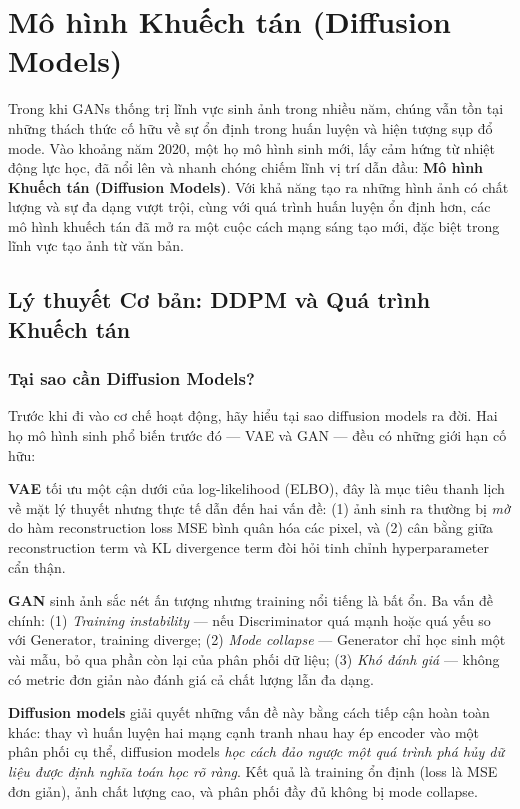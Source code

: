 \section{Mô hình Khuếch tán (Diffusion Models)}
\label{sec:diffusion_models}

Trong khi GANs thống trị lĩnh vực sinh ảnh trong nhiều năm, chúng vẫn tồn tại những thách thức cố hữu về sự ổn định trong huấn luyện và hiện tượng sụp đổ mode. Vào khoảng năm 2020, một họ mô hình sinh mới, lấy cảm hứng từ nhiệt động lực học, đã nổi lên và nhanh chóng chiếm lĩnh vị trí dẫn đầu: \textbf{Mô hình Khuếch tán (Diffusion Models)}. Với khả năng tạo ra những hình ảnh có chất lượng và sự đa dạng vượt trội, cùng với quá trình huấn luyện ổn định hơn, các mô hình khuếch tán đã mở ra một cuộc cách mạng sáng tạo mới, đặc biệt trong lĩnh vực tạo ảnh từ văn bản.

\subsection{Lý thuyết Cơ bản: DDPM và Quá trình Khuếch tán}
\label{subsec:diffusion_theory}

\subsubsection{Tại sao cần Diffusion Models?}
\label{subsubsec:diffusion_motivation}

Trước khi đi vào cơ chế hoạt động, hãy hiểu tại sao diffusion models ra đời. Hai họ mô hình sinh phổ biến trước đó --- VAE và GAN --- đều có những giới hạn cố hữu:

\textbf{VAE} tối ưu một cận dưới của log-likelihood (ELBO), đây là mục tiêu thanh lịch về mặt lý thuyết nhưng thực tế dẫn đến hai vấn đề: (1) ảnh sinh ra thường bị \textit{mờ} do hàm reconstruction loss MSE bình quân hóa các pixel, và (2) cân bằng giữa reconstruction term và KL divergence term đòi hỏi tinh chỉnh hyperparameter cẩn thận.

\textbf{GAN} sinh ảnh sắc nét ấn tượng nhưng training nổi tiếng là bất ổn. Ba vấn đề chính: (1) \textit{Training instability} --- nếu Discriminator quá mạnh hoặc quá yếu so với Generator, training diverge; (2) \textit{Mode collapse} --- Generator chỉ học sinh một vài mẫu, bỏ qua phần còn lại của phân phối dữ liệu; (3) \textit{Khó đánh giá} --- không có metric đơn giản nào đánh giá cả chất lượng lẫn đa dạng.

\textbf{Diffusion models} giải quyết những vấn đề này bằng cách tiếp cận hoàn toàn khác: thay vì huấn luyện hai mạng cạnh tranh nhau hay ép encoder vào một phân phối cụ thể, diffusion models \textit{học cách đảo ngược một quá trình phá hủy dữ liệu được định nghĩa toán học rõ ràng}. Kết quả là training ổn định (loss là MSE đơn giản), ảnh chất lượng cao, và phân phối đầy đủ không bị mode collapse.

